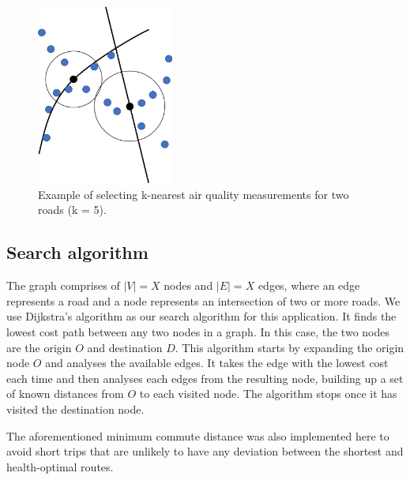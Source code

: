 \documentclass[11pt]{report}
\begin{document}

\begin{figure}[!tb]
\centering
\includegraphics[width=0.4\textwidth]{images/knn}
\caption[K-nearest neighbours.]{Example of selecting k-nearest air quality measurements for two roads (k = 5).}
\label{fig:knn}
\end{figure}

\subsection{Search algorithm}

The graph comprises of $|V| = X$ nodes and $|E| = X$ edges, where an edge represents a road and a node represents an intersection of two or more roads. We use Dijkstra's algorithm \citep{dijkstra1959} as our search algorithm for this application. It finds the lowest cost path between any two nodes in a graph. In this case, the two nodes are the origin $O$ and destination $D$. This algorithm starts by expanding the origin node $O$ and analyses the available edges. It takes the edge with the lowest cost each time and then analyses each edges from the resulting node, building up a set of known distances from $O$ to each visited node. The algorithm stops once it has visited the destination node.

The aforementioned minimum commute distance was also implemented here to avoid short trips that are unlikely to have any deviation between the shortest and health-optimal routes.

\end{document}
